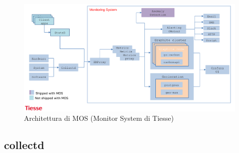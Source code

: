 \begin{figure}[]
    \label{fig:mos}
    \includegraphics[width=\hsize]{images/my_work/tiesse_mos.png}
    \caption{Architettura di MOS (Monitor System di Tiesse)}
    \centering
\end{figure}

\subsection{collectd}


